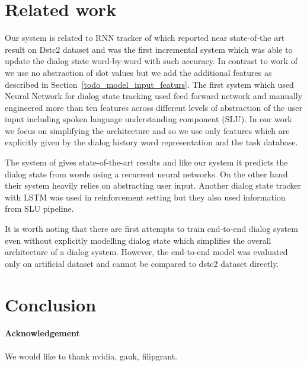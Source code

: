 \documentclass{itatnew}
\begin{document}
\section{Related work}
Our system is related to RNN tracker of \cite{Zilka} which reported near state-of-the art result on Dstc2 dataset and was the first incremental system which was able to update the dialog state word-by-word with such accuracy.
In contrast to work of \cite{Zilka} we use no abstraction of slot values but we add the additional features as described in Section~\ref{todo_model_input_featurs}.
The first system which used Neural Network for dialog state tracking \cite{henderson} used feed forward network and manually engineered more than ten features across different levels of abstraction of the user input including spoken language understanding component (SLU).
In our work we focus on simplifying the architecture and so we use only features which are explicitly given by the dialog history word representation and the task database.

The system of \cite{Word-based dialog state tracking with recurrent neural networks-Henderson} gives state-of-the-art results and like our system it predicts the dialog state from words using a recurrent neural networks.
On the other hand their system heavily relies on abstracting user input.
Another dialog state tracker with LSTM was used in reinforcement setting but they also used information from SLU pipeline.\cite{Dialog History Construction with Long-Short Term Memory for Robust Generative Dialog State Tracking}

It is worth noting that there are first attempts to train end-to-end dialog system even without explicitly modelling dialog state\cite{Weston} which simplifies the overall architecture of a dialog system.
However, the end-to-end model was evaluated only on artificial dataset and cannot be compared to dstc2 dataset directly.

\section{Conclusion}




\paragraph{Acknowledgement}
We would like to thank nvidia, gauk, filipgrant.
\end{document}
